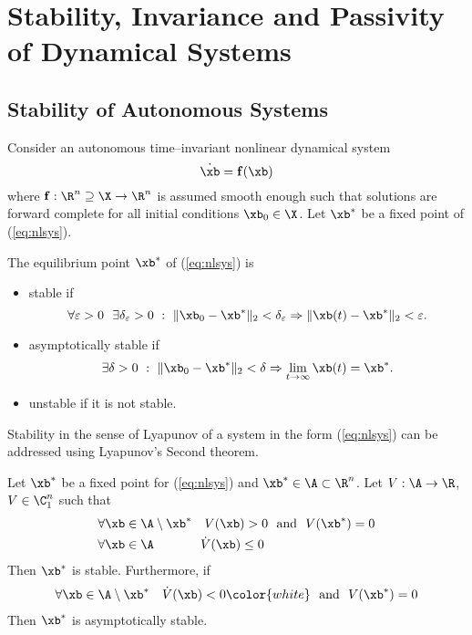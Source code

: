 \chapter{Stability, Invariance and Passivity of Dynamical Systems}
%
\section{Stability of Autonomous Systems}
%
Consider an autonomous time--invariant nonlinear dynamical system
%
\begin{equation}\label{eq:nlsys}
    \dot{\xb} = \mathbf{f}(\xb)
\end{equation}
%
where $\mathbf{f}:\R^n\supseteq\X\rightarrow\R^n$ is assumed smooth enough such that solutions are forward complete for all initial conditions $\xb_0\in\X$. Let $\xb^*$ be a fixed point of (\ref{eq:nlsys}).
%
\begin{defn}
    The equilibrium point $\xb^*$ of (\ref{eq:nlsys}) is 
    \begin{itemize}
        \item stable if
            \begin{equation}
                \forall \varepsilon>0 ~~  \exists \delta_\varepsilon>0~:~\|\xb_0 - \xb^*\|_2 <\delta_\varepsilon \Rightarrow \|\xb(t) - \xb^*\|_2<\varepsilon.
            \end{equation}
            \item asymptotically stable if
            \begin{equation}
                \exists \delta>0~:~\|\xb_0 - \xb^*\|_2<\delta\Rightarrow\lim_{t\rightarrow\infty}\xb(t) =  \xb^*.
            \end{equation}
        \item unstable if it is not stable.
    \end{itemize}
\end{defn}
%
Stability in the sense of Lyapunov of a system in the form (\ref{eq:nlsys}) can be addressed using Lyapunov's Second theorem.
%
\begin{thm}
    Let $\xb^*$ be a fixed point for (\ref{eq:nlsys}) and $\xb^*\in\A\subset\R^n$. Let $V:\A\rightarrow\R$, $V\in\C_1^n$ such that
    \begin{align}
        & \forall \xb\in\A\setminus\xb^* ~~~ V(\xb)>0~~\text{and}~~V(\xb^*) = 0\\
        & \forall \xb\in\A ~~~~~~~~~~~ \dot{V}(\xb)\leq 0
    \end{align}
    Then $\xb^*$ is stable. Furthermore, if
    \begin{align}
        \forall \xb\in\A \setminus\xb^* ~~~ \dot{V}(\xb)< 0 {\color{white}~~\text{and}~~V(\xb^*) = 0}
    \end{align}
    Then $\xb^*$ is asymptotically stable.
\end{thm}
%
